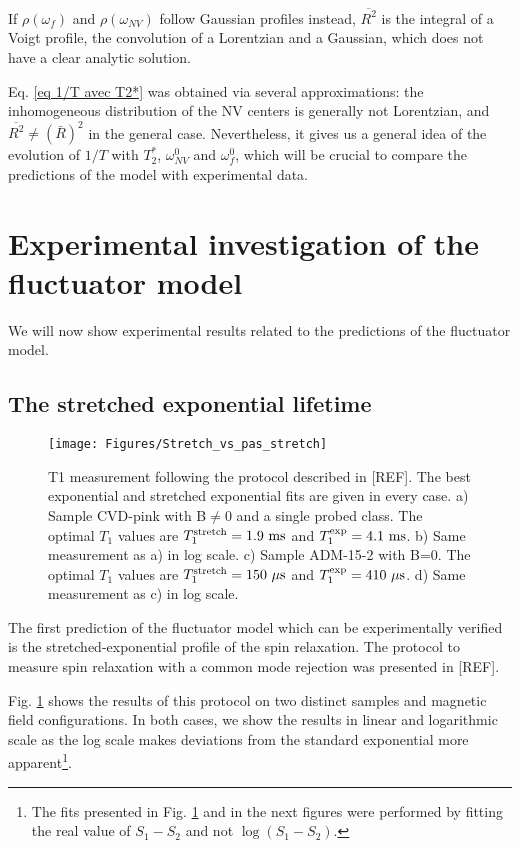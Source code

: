\documentclass[a4paper,11pt]{report}
\begin{document}
If $\rho(\omega_{f})$ and $\rho(\omega_{NV})$ follow Gaussian profiles instead, $\overline{R^2}$ is the integral of a Voigt profile, the convolution of a Lorentzian and a Gaussian, which does not have a clear analytic solution.

Eq. \ref{eq 1/T avec T2*} was obtained via several approximations: the inhomogeneous distribution of the NV centers is generally not Lorentzian, and $\overline{R^2} \neq (\bar{R})^2$ in the general case. Nevertheless, it gives us a general idea of the evolution of $1/T$ with $T_2^*$, $\omega_{NV}^0$ and $\omega_{f}^0$, which will be crucial to compare the predictions of the model with experimental data.






\section{Experimental investigation of the fluctuator model}
We will now show experimental results related to the predictions of the fluctuator model.
\subsection{The stretched exponential lifetime}
\begin{figure}[h]
\centering
\texttt{[image: Figures/Stretch\_vs\_pas\_stretch]}
\caption{T1 measurement following the protocol described in [REF]. The best exponential and stretched exponential fits are given in every case. a) Sample CVD-pink with B$\neq$0 and a single  probed class. The optimal $T_1$ values are $T_1^{\rm stretch}=1.9\ \rm ms$ and $T_1^{\rm exp}=4.1\ \rm ms$. b) Same measurement as a) in log scale. c) Sample ADM-15-2 with B=0. The optimal $T_1$ values are $T_1^{\rm stretch}=150\ \mu \rm s$ and $T_1^{\rm exp}=410\ \mu \rm s$. d) Same measurement as c) in log scale.}
\label{stretch_or_not_stretch}
\end{figure}

The first prediction of the fluctuator model which can be experimentally verified is the stretched-exponential profile of the spin relaxation. The protocol to measure spin relaxation with a common mode rejection was presented in [REF]. 

Fig. \ref{stretch_or_not_stretch} shows the results of this protocol on two distinct samples and magnetic field configurations. In both cases, we show the results in linear and logarithmic scale as the log scale makes deviations from the standard exponential more apparent\footnote{The fits presented in Fig. \ref{stretch_or_not_stretch} and in the next figures were performed by fitting the real value of $S_1-S_2$ and not $\log(S_1-S_2)$.}.
\end{document}
